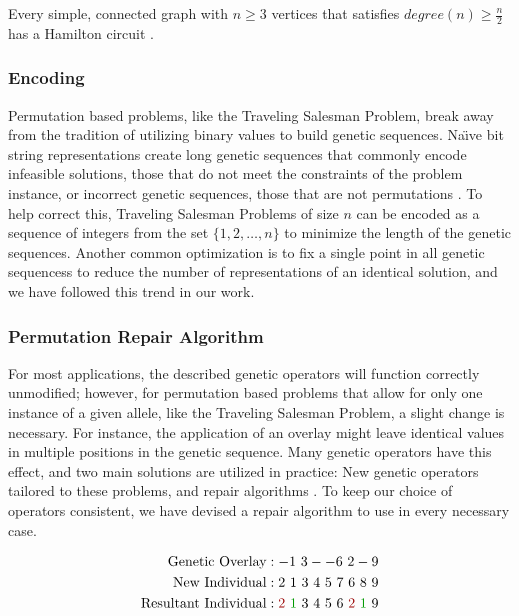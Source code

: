 \begin{thm}
Every simple, connected graph with $n \geq 3$ vertices that satisfies $degree(n) \geq \frac{n}{2}$ has a Hamilton circuit \cite{Wolfram}.
\end{thm}

\subsubsection*{Encoding}
Permutation based problems, like the Traveling Salesman Problem, break away from the tradition of utilizing binary values to build genetic sequences. Na\"{\i}ve bit string representations create long genetic sequences that commonly encode infeasible solutions, those that do not meet the constraints of the problem instance, or incorrect genetic sequences, those that are not permutations \cite{Potvin96}. To help correct this, Traveling Salesman Problems of size $n$ can be encoded as a sequence of integers from the set $\{1, 2, \ldots, n\}$ to minimize the length of the genetic sequences. Another common optimization is to fix a single point in all genetic sequencess to reduce the number of representations of an identical solution, and we have followed this trend in our work. 

\subsubsection*{Permutation Repair Algorithm}
For most applications, the described genetic operators will function correctly unmodified; however, for permutation based problems that allow for only one instance of a given allele, like the Traveling Salesman Problem, a slight change is necessary. For instance, the application of an overlay might leave identical values in multiple positions in the genetic sequence. Many genetic operators have this effect, and two main solutions are utilized in practice: New genetic operators tailored to these problems, and repair algorithms \cite{Larranaga99}. To keep our choice of operators consistent, we have devised a repair algorithm to use in every necessary case.
 
\begin{align*}
\text{Genetic Overlay} &:   -1~3--6~2-9				\\
\text{New Individual} &: 2~1~3~4~5~7~6~8~9			\\		
\text{Resultant Individual} &: {\color{myred}2}~{\color{mygreen}1}~3~4~5~6~{\color{myred}2}~{\color{mygreen}1}~9
\end{align*}

